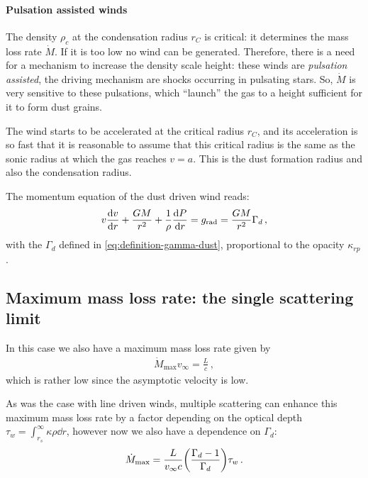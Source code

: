 \documentclass[main.tex]{subfiles}
\begin{document}


\paragraph{Pulsation assisted winds}

The density \(\rho_{c}\) at the condensation radius \(r_C\) is critical: it determines the mass loss rate \(\dot{M}\). 
If it is too low no wind can be generated.
Therefore, there is a need for a mechanism to increase the density scale height: these winds are \emph{pulsation assisted}, the driving mechanism are shocks occurring in pulsating stars.
So, \(\dot{M}\) is very sensitive to these pulsations, which ``launch'' the gas to a height sufficient for it to form dust grains.

The wind starts to be accelerated at the critical radius \(r_C\), and its acceleration is so fast that it is reasonable to assume that this critical radius is the same as the sonic radius at which the gas reaches \(v=a\). 
This is the dust formation radius and also the condensation radius.

The momentum equation of the dust driven wind reads: 
%
\begin{align}
v \dv{v}{r} + \frac{GM}{r^2} + \frac{1}{\rho }\dv{P}{r} = g _{\text{rad}} = \frac{GM}{r^2} \Gamma_{d}
\,,
\end{align}
%
with the \(\Gamma_{d}\) defined in \eqref{eq:definition-gamma-dust}, proportional to the opacity \(\kappa_{rp}\).

\subsection{Maximum mass loss rate: the single scattering limit}

In this case we also have a maximum mass loss rate given by 
%
\begin{align}
\dot{M} _{\text{max}} v_{ \infty } = \frac{L}{c}
\,,
\end{align}
%
which is rather low since the asymptotic velocity is low.

As was the case with line driven winds, multiple scattering can enhance this maximum mass loss rate by a factor depending on the optical depth \(\tau_{w} = \int_{r_s}^{ \infty } \kappa \rho \dd{r}\), however now we also have a dependence on \(\Gamma_{d}\): 
%
\begin{align}
\dot{M} _{\text{max}} = \frac{L}{v_{ \infty } c } \qty(\frac{\Gamma_{d} -1}{\Gamma_{d}}) \tau_{w}
\,.
\end{align}
\end{document}
